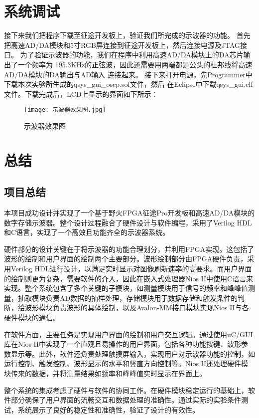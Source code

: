 \documentclass[lang=cn,a4paper,newtx]{elegantpaper}
\begin{document}
\section{系统调试}
	接下来我们把程序下载至征途开发板上，验证我们所完成的示波器的功能。
	首先把高速AD/DA模块和5寸RGB屏连接到征途开发板上，然后连接电源及JTAG接口。
	为了验证示波器的功能，我们在程序中利用高速AD/DA模块上的DA芯片输出了一个频率为
	195.3KHz的正弦波，因此还需要用两端都是公头的杜邦线将高速AD/DA模块的DA输出与AD输入
	连接起来。
	接下来打开电源，先Programmer中下载本次实验所生成的qsys\_gui\_oscp.sof文件，然后
	在Eclipse中下载qsys\_gui.elf文件。下载完成后，LCD上显示的界面如下所示：
	  \begin{figure}[!htb]
		\centering
		\caption{示波器效果图}
		\label{示波器效果图}
		\texttt{[image: 示波器效果图.jpg]}
	\end{figure}
\section{总结}
\subsection{项目总结}
	本项目成功设计并实现了一个基于野火FPGA征途Pro开发板和高速AD/DA模块的数字存储示波器。整个设计过程融合了硬件设计与软件编程，采用了Verilog HDL和C语言，实现了一个高效且功能齐全的示波器系统。
	
	硬件部分的设计关键在于将示波器的功能合理划分，并利用FPGA实现。这包括了波形的绘制和用户界面的绘制两个主要部分。波形绘制部分由FPGA硬件负责，采用Verilog HDL进行设计，以满足实时显示对图像刷新速率的高要求。而用户界面的绘制则更为复杂，需要软件的介入，因此在嵌入式处理器Nios II中使用C语言来实现。整个系统包含了多个关键的子模块，如测量模块用于信号的频率和峰峰值测量，抽取模块负责AD数据的抽样处理，存储模块用于数据存储和触发条件的判断，绘波形模块负责波形的具体绘制，以及Avalon-MM接口模块实现Nios II与各硬件模块的通信。
	
	在软件方面，主要任务是实现用户界面的绘制和用户交互逻辑。通过使用uC/GUI库在Nios II中实现了一个直观且易操作的用户界面，包括各种功能按键、波形参数显示等。此外，软件还负责处理触摸屏输入，实现用户对示波器功能的控制，如运行控制、触发控制、波形显示的水平和竖直方向控制等。Nios II还处理硬件模块传来的数据，并将测量结果如频率和峰峰值实时显示在界面上。
	
	整个系统的集成考虑了硬件与软件的协同工作。在硬件模块稳定运行的基础上，软件部分确保了用户界面的流畅交互和数据处理的准确性。通过实际的实验条件测试，系统展示了良好的稳定性和准确性，验证了设计的有效性。
	
\end{document}
